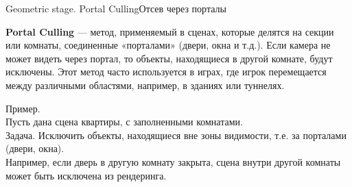 \documentclass{beamer}
\begin{document}
	\begin{frame}{Geometric stage. Portal Culling}{Отсев через порталы}
		
		\textbf{Portal Culling} --- метод, применяемый в сценах, которые делятся на секции или комнаты, соединенные «порталами» (двери, окна и т.д.). Если камера не может видеть через портал, то объекты, находящиеся в другой комнате, будут исключены. Этот метод часто используется в играх, где игрок перемещается между различными областями, например, в зданиях или туннелях.
		
		\vspace{0.5cm}
		Пример. \\ 
		Пусть дана сцена квартиры, с заполненными комнатами. \\
		Задача. Исключить объекты, находящиеся вне зоны видимости, т.е. за порталами (двери, окна).\\
		Например, если дверь в другую комнату закрыта, сцена внутри другой комнаты может быть исключена из рендеринга. \\
				

	\end{frame}
\end{document}
